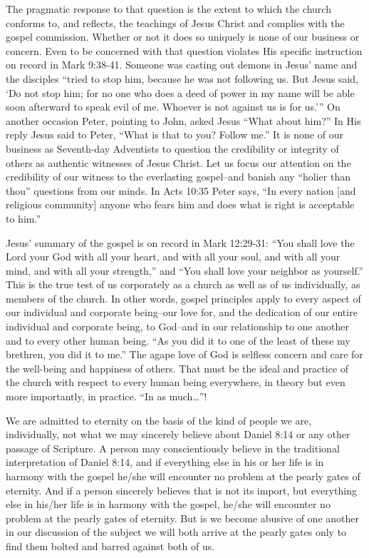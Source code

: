 The pragmatic response to that question is the extent to which the church
conforms to, and reflects, the teachings of Jesus Christ and complies with
the gospel commission. Whether or not it does so uniquely is none of our
business or concern. Even to be concerned with that question violates His
specific instruction on record in Mark 9:38-41. Someone was casting out
demons in Jesus' name and the disciples ``tried to stop him, because he was
not following us. But Jesus said, `Do not stop him; for no one who does a
deed of power in my name will be able soon afterward to speak evil of me.
Whoever is not against us is for us.''' On another occasion Peter, pointing
to John, asked Jesus ``What about him?'' In His reply Jesus said to Peter,
``What is that to you? Follow me.'' It is none of our business as Seventh-day
Adventists to question the credibility or integrity of others as authentic
witnesses of Jesus Christ. Let us focus our attention on the credibility of
our witness to the everlasting gospel--and banish any ``holier than thou''
questions from our minds. In Acts 10:35 Peter says, ``In every nation [and
religious community] anyone who fears him and does what is right is
acceptable to him.''

Jesus' summary of the gospel is on record in Mark 12:29-31: ``You shall love
the Lord your God with all your heart, and with all your soul, and with all
your mind, and with all your strength,'' and ``You shall love your neighbor as
yourself.'' This is the true test of us corporately as a church as well as of
us individually, as members of the church. In other words, gospel principles
apply to every aspect of our individual and corporate being--our love for,
and the dedication of our entire individual and corporate being, to 
God--and in our relationship to one another and to every other human being.
``As you did it to one of the least of these my brethren, you did it to
me.'' The agape love of God is selfless concern and care for the
well-being and happiness of others. That must be the ideal and practice of
the church with respect to every human being everywhere, in theory but even
more importantly, in practice. ``In as much\ldots''!

We are admitted to eternity on the basis of the kind of people we are,
individually, not what we may sincerely believe about Daniel 8:14 or any
other passage of Scripture. A person may conscientiously believe in the
traditional interpretation of Daniel 8:14, and if everything else in his or
her life is in harmony with the gospel he/she will encounter no problem at
the pearly gates of eternity. And if a person sincerely believes that is not
its import, but everything else in his/her life is in harmony with the
gospel, he/she will encounter no problem at the pearly gates of eternity.
But is we become abusive of one another in our discussion of the subject we
will both arrive at the pearly gates only to find them bolted and barred
against both of us.

